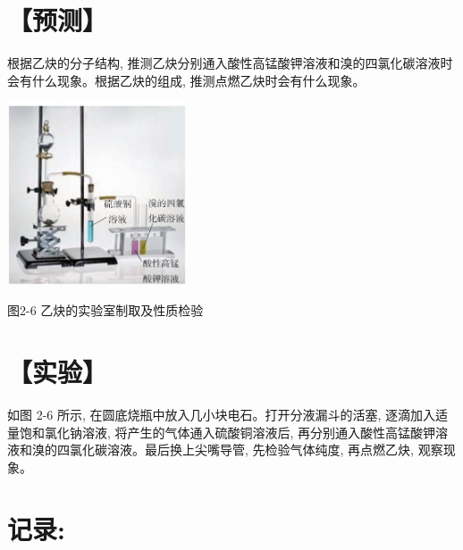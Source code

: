 \documentclass[10pt]{article}
\begin{document}
\section*{【预测】}

根据乙炔的分子结构, 推测乙炔分别通入酸性高锰酸钾溶液和溴的四氯化碳溶液时会有什么现象。根据乙炔的组成, 推测点燃乙炔时会有什么现象。

\begin{center}
\includegraphics[max width=0.4\textwidth]{images/0190efc5-b58a-7c43-bfb0-e0a030df9cfd_43_629399.jpg}
\end{center}

图2-6 乙炔的实验室制取及性质检验

\section*{【实验】}

如图 2-6 所示, 在圆底烧瓶中放入几小块电石。打开分液漏斗的活塞, 逐滴加入适量饱和氯化钠溶液, 将产生的气体通入硫酸铜溶液后, 再分别通入酸性高锰酸钾溶液和溴的四氯化碳溶液。最后换上尖嘴导管, 先检验气体纯度, 再点燃乙炔, 观察现象。

\section*{记录:}

\begin{center}
\end{center}
\end{document}
